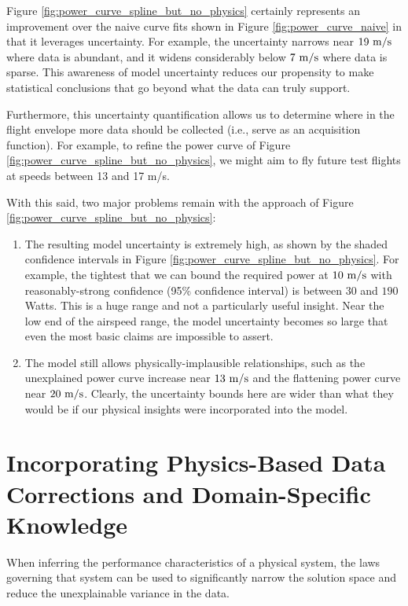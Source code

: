 \documentclass[conf]{new-aiaa}
\begin{document}
    Figure \ref{fig:power_curve_spline_but_no_physics} certainly represents an improvement over the naive curve fits shown in Figure \ref{fig:power_curve_naive} in that it leverages uncertainty. For example, the uncertainty narrows near $19\ \rm m/s$ where data is abundant, and it widens considerably below $7\ \rm m/s$ where data is sparse. This awareness of model uncertainty reduces our propensity to make statistical conclusions that go beyond what the data can truly support.

    Furthermore, this uncertainty quantification allows us to determine where in the flight envelope more data should be collected (i.e., serve as an acquisition function). For example, to refine the power curve of Figure \ref{fig:power_curve_spline_but_no_physics}, we might aim to fly future test flights at speeds between 13 and 17 m/s.

    With this said, two major problems remain with the approach of Figure \ref{fig:power_curve_spline_but_no_physics}:

    \begin{enumerate}
        \item The resulting model uncertainty is extremely high, as shown by the shaded confidence intervals in Figure \ref{fig:power_curve_spline_but_no_physics}. For example, the tightest that we can bound the required power at $10\ \rm m/s$ with reasonably-strong confidence (95\% confidence interval) is between $30$ and $190$ Watts. This is a huge range and not a particularly useful insight. Near the low end of the airspeed range, the model uncertainty becomes so large that even the most basic claims are impossible to assert.
        \item The model still allows physically-implausible relationships, such as the unexplained power curve increase near $13\ \rm m/s$ and the flattening power curve near $20\ \rm m/s$. Clearly, the uncertainty bounds here are wider than what they would be if our physical insights were incorporated into the model.
    \end{enumerate}


    \section{Incorporating Physics-Based Data Corrections and Domain-Specific Knowledge}
    \label{sec:physics_based_corrections}

    When inferring the performance characteristics of a physical system, the laws governing that system can be used to significantly narrow the solution space and reduce the unexplainable variance in the data.
\end{document}

